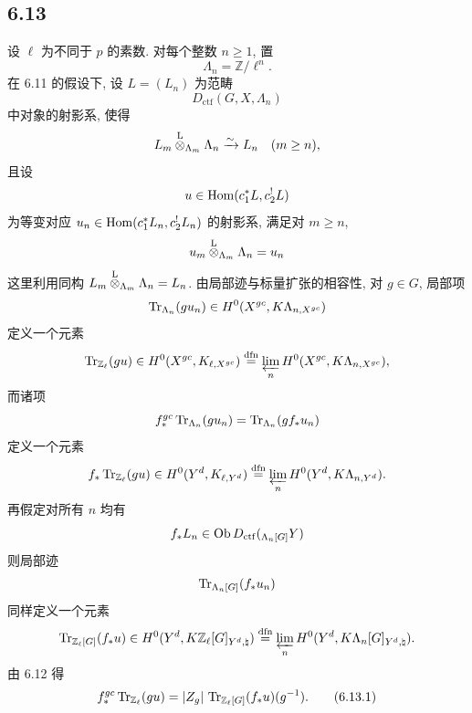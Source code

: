 \subsection*{6.13}
设 $\ell$ 为不同于 $p$ 的素数. 对每个整数 $n\ge1$, 置
\[
\Lambda_n=\mathbb Z/\ell^n.
\]
在 6.11 的假设下, 设 $L=(L_n)$ 为范畴
\[
D_{\mathrm{ctf}}(G,X,\Lambda_n)
\]
中对象的射影系, 使得
\[
L_m\overset{\mathrm L}{\otimes}_{\Lambda_m}\Lambda_n\xrightarrow{\sim}L_n\quad (m\ge n),
\]
且设
\[
u\in\operatorname{Hom}(c_1^*L,c_2^!L)
\]
为等变对应 $u_n\in\operatorname{Hom}(c_1^*L_n,c_2^!L_n)$ 的射影系, 满足对 $m\ge n$,
\[
u_m\overset{\mathrm L}{\otimes}_{\Lambda_m}\Lambda_n=u_n
\]
这里利用同构 $L_m\overset{\mathrm L}{\otimes}_{\Lambda_m}\Lambda_n=L_n$. 由局部迹与标量扩张的相容性, 对 $g\in G$, 局部项
\[
\operatorname{Tr}_{\Lambda_n}(gu_n)\in H^0(X^{gc},K\Lambda_{n,X^{gc}})
\]
定义一个元素
\[
\operatorname{Tr}_{\mathbb Z_{\ell}}(gu)\in
H^0(X^{gc},K_{\ell,X^{gc}})
\stackrel{\mathrm{dfn}}{=}
\varprojlim_n H^0(X^{gc},K\Lambda_{n,X^{gc}}),
\]
而诸项
\[
f_*^{gc}\operatorname{Tr}_{\Lambda_n}(gu_n)=\operatorname{Tr}_{\Lambda_n}(gf_*u_n)
\]
定义一个元素
\[
f_*\operatorname{Tr}_{\mathbb Z_{\ell}}(gu)\in
H^0(Y^d,K_{\ell,Y^d})
\stackrel{\mathrm{dfn}}{=}
\varprojlim_n H^0(Y^d,K\Lambda_{n,Y^d}).
\]
再假定对所有 $n$ 均有
\[
f_*L_n\in\operatorname{Ob} D_{\mathrm{ctf}}({}_{\Lambda_n[G]}Y)
\]
则局部迹
\[
\operatorname{Tr}_{\Lambda_n[G]}(f_*u_n)
\]
同样定义一个元素
\[
\operatorname{Tr}_{\mathbb Z_{\ell}[G]}(f_*u)\in
H^0(Y^d,K\mathbb Z_{\ell}[G]_{Y^d,\natural})
\stackrel{\mathrm{dfn}}{=}
\varprojlim_n H^0(Y^d,K\Lambda_n[G]_{Y^d,\natural}).
\]
由 6.12 得
\begin{equation}
f_*^{gc}\operatorname{Tr}_{\mathbb Z_{\ell}}(gu)
=
|Z_g|\,\operatorname{Tr}_{\mathbb Z_{\ell}[G]}(f_*u)(g^{-1}).
\tag{6.13.1}
\end{equation}


